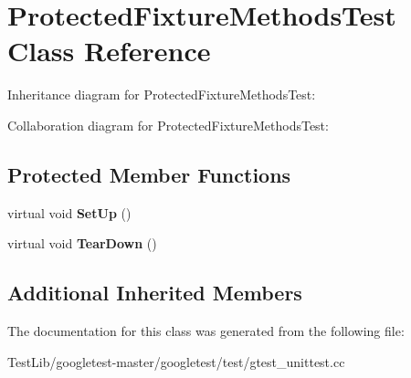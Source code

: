 \hypertarget{classProtectedFixtureMethodsTest}{}\section{Protected\+Fixture\+Methods\+Test Class Reference}
\label{classProtectedFixtureMethodsTest}


Inheritance diagram for Protected\+Fixture\+Methods\+Test\+:


Collaboration diagram for Protected\+Fixture\+Methods\+Test\+:
\subsection*{Protected Member Functions}
\begin{DoxyCompactItemize}
\item 
\mbox{\label{classProtectedFixtureMethodsTest_a5184c708ac89cfb69f0e4c742e93398a}} 
virtual void {\bfseries Set\+Up} ()
\item 
\mbox{\label{classProtectedFixtureMethodsTest_aa143dff0a99903cde207b6fd0042c03c}} 
virtual void {\bfseries Tear\+Down} ()
\end{DoxyCompactItemize}
\subsection*{Additional Inherited Members}


The documentation for this class was generated from the following file\+:\begin{DoxyCompactItemize}
\item 
Test\+Lib/googletest-\/master/googletest/test/gtest\+\_\+unittest.\+cc\end{DoxyCompactItemize}
